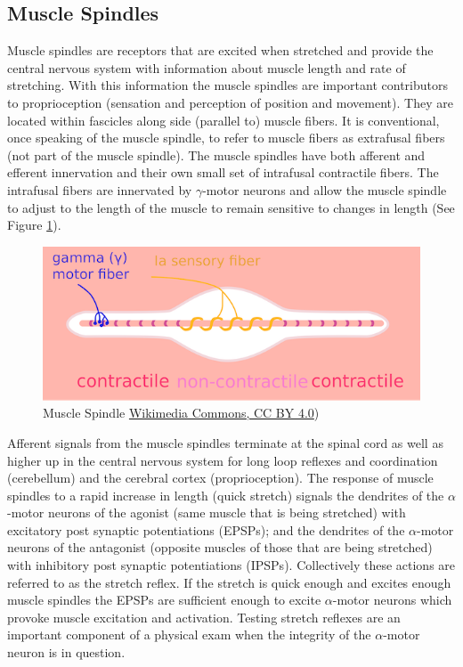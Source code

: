 \subsection{Muscle Spindles}

Muscle spindles are receptors that are excited when stretched and provide the central nervous system with information about muscle length and rate of stretching. With this information the muscle spindles are important contributors to proprioception (sensation and perception of position and movement). They are located within fascicles along side (parallel to) muscle fibers. It is conventional, once speaking of the muscle spindle, to refer to muscle fibers as extrafusal fibers (not part of the muscle spindle). The muscle spindles have both afferent and efferent innervation and their own small set of intrafusal contractile fibers. The intrafusal fibers are innervated by $\gamma$-motor neurons and allow the muscle spindle to adjust to the length of the muscle to remain sensitive to changes in length (See Figure \ref{fig:MuscleSpindle}). 

\begin{figure}[!ht]
    \centering
    \includegraphics[width=1\linewidth]{./figure/MuscleSpindle.png}
    \caption{Muscle Spindle \footnotesize{\href{https://commons.wikimedia.org/wiki/File:MuscleSpindle.svg}{Wikimedia Commons, CC BY 4.0})}}
    \label{fig:MuscleSpindle}
\end{figure}

Afferent signals from the muscle spindles terminate at the spinal cord as well as higher up in the central nervous system for long loop reflexes and coordination (cerebellum) and the cerebral cortex (proprioception). The response of muscle spindles to a rapid increase in length (quick stretch) signals the dendrites of the $\alpha$-motor neurons of the agonist (same muscle that is being stretched) with excitatory post synaptic potentiations (EPSPs); and the dendrites of the $\alpha$-motor neurons of the antagonist (opposite muscles of those that are being stretched) with inhibitory post synaptic potentiations (IPSPs). Collectively these actions are referred to as the stretch reflex. If the stretch is quick enough and excites enough muscle spindles the EPSPs are sufficient enough to excite $\alpha$-motor neurons which provoke muscle excitation and activation. Testing stretch reflexes are an important component of a physical exam when the integrity of the $\alpha$-motor neuron is in question.

